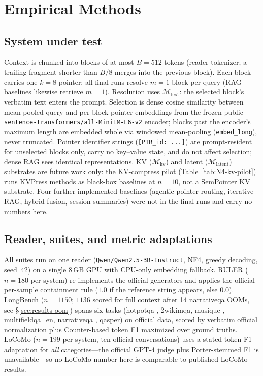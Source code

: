 \documentclass[runningheads]{llncs}
\begin{document}
{\section{Empirical Methods}\label{sec:experiments}\label{sec:methods}
\subsection{System under test}\label{sec:methods-selection}
Context is chunked into blocks of at most $B=512$ tokens (reader tokenizer;
a trailing fragment shorter than $B/8$ merges into the previous block). Each block
carries one $k=8$ pointer; all final runs resolve $m=1$ block per query
(RAG baselines likewise retrieve $m=1$). Resolution uses $\mathcal{M}_{\mathrm{text}}$:
the selected block's verbatim text enters the prompt. Selection is dense cosine
similarity between mean-pooled query and per-block pointer embeddings from the
frozen public \texttt{sentence-transformers/all-MiniLM-L6-v2} encoder; blocks past
the encoder's maximum length are embedded whole via windowed mean-pooling
(\texttt{embed\_long}), never truncated. Pointer identifier strings
(\texttt{[PTR\_id: ...]}) are prompt-resident for unselected blocks only, carry
no key--value state, and do not affect selection; dense RAG sees identical
representations. KV ($\mathcal{M}_{\mathrm{kv}}$) and latent
($\mathcal{M}_{\mathrm{latent}}$) substrates are future work only\label{sec:methods-scope}: the KV-compress
pilot (Table~\ref{tab:N4-kv-pilot}) runs KVPress methods as black-box baselines at
$n=10$, not a SemPointer KV substrate. Four further implemented baselines (agentic
pointer routing, iterative RAG, hybrid fusion, session summaries) were not in the
final runs and carry no numbers here.
\subsection{Reader, suites, and metric adaptations}
All suites run on one reader (\texttt{Qwen/Qwen2.5-3B-Instruct}, NF4, greedy
decoding, seed~42) on a single 8\,GB GPU with CPU-only embedding fallback.
RULER ($n=180$ per system) re-implements the official generators and applies the
official per-sample containment rule ($1.0$ if the reference string appears, else
$0.0$). LongBench ($n=1150$; $1136$ scored for full context after 14 narrativeqa
OOMs, see \S\ref{sec:results-oom}) spans six tasks (hotpotqa \cite{yang2018hotpotqa}, 2wikimqa, musique \cite{trivedi2022musique},
multifieldqa\_en, narrativeqa \cite{kovcisky2018narrativeqa}, qasper) on official data, scored by verbatim
official normalization plus Counter-based token F1 maximized over ground truths.
LoCoMo ($n=199$ per system, ten official conversations) uses a stated token-F1
adaptation for \textit{all} categories---the official GPT-4 judge plus
Porter-stemmed F1 is unavailable---so no LoCoMo number here is comparable to
published LoCoMo results.
}
\end{document}
